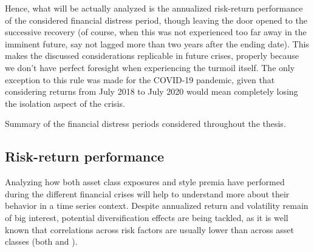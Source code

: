 \documentclass[12pt]{article}
\begin{document}
Hence, what will be actually analyzed is the annualized risk-return performance of the considered financial distress period, though leaving the door opened to the successive recovery (of course, when this was not experienced too far away in the imminent future, say not lagged more than two years after the ending date). This makes the discussed considerations replicable in future crises, properly because we don't have perfect foresight when experiencing the turmoil itself. The only exception to this rule was made for the COVID-19 pandemic, given that considering returns from July 2018 to July 2020 would mean completely losing the isolation aspect of the crisis. \\

\begin{table}[H]
\centering
\caption{Summary of the financial distress periods considered throughout the thesis.}
\label{crises_table}
\bigskip
\caption*{\textit{Notes}: No financial distress period has been considered between 2013 and 2020 because, despite the Trade War and Brexit caused significance turbulences, respecting the two years data self-imposed constraint during this long period would inevitably considering flourishing years as well, risking to bias the analysis.}
\end{table}

\subsection{Risk-return performance}
Analyzing how both asset class exposures and style premia have performed during the different financial crises will help to understand more about their behavior in a time series context. Despite annualized return and volatility remain of big interest, potential diversification effects are being tackled, as it is well known that correlations across risk factors are usually lower than across asset classes (both  and ). 
\end{document}

